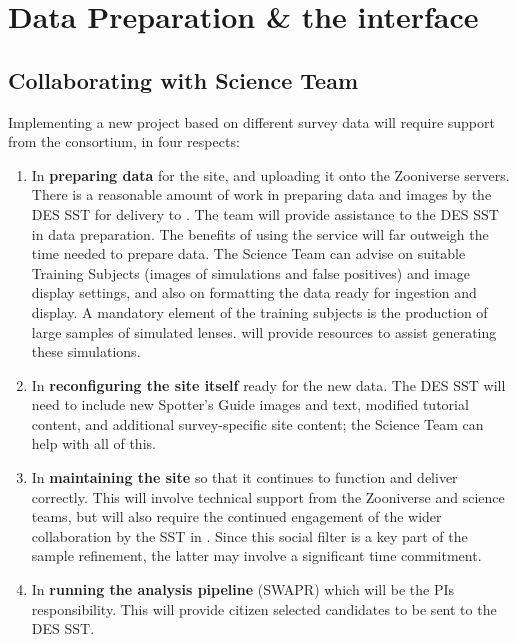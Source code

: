 \documentclass[a4paper,twocolumn]{article}
\begin{document}

\section{Data Preparation \& the \SW interface}
\label{sec:data}

\subsection{Collaborating with \SW Science Team}

Implementing a new project based on different survey data will require support from the \SW consortium, in four respects: 

\begin{enumerate}

\item In {\bf preparing data} for the site, and uploading it onto the
Zooniverse servers. There is a reasonable amount of work in preparing data and images by the DES SST for delivery to \SW. The \SW team will provide assistance to the DES SST in data preparation. The benefits of using the \SW service will far outweigh the time needed to prepare data.  The \SW Science Team can advise on suitable Training
Subjects (images of simulations and false positives) and image display settings, and also on formatting the data
ready for ingestion and display. A mandatory element of the training subjects is the production of large samples of simulated lenses. \SW will provide resources to assist generating these simulations. 

\item In {\bf reconfiguring the site itself} ready for the new data. The DES
SST will need to include new Spotter's Guide images and text,
modified tutorial content, and additional survey-specific site content;
the \SW Science Team can help with all of this.

\item In {\bf maintaining the site} so that it continues to function and deliver
correctly. This will involve technical support from the Zooniverse and \SW science teams,
but will also require the continued engagement of the wider
collaboration by the SST in \Talk. Since this social filter is
a key part of the sample refinement, the latter may involve a
significant time commitment.

\item In {\bf running the \SW analysis pipeline} (SWAPR) which will be the \sw PIs responsibility. This will provide citizen selected candidates to be sent to the DES SST.

\end{enumerate}
\end{document}
